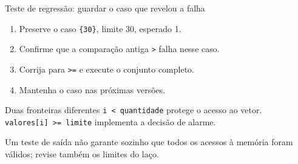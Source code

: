 \begin{frame}{Teste de regressão: guardar o caso que revelou a falha}
\begin{enumerate}
\item Preserve o caso \texttt{\{30\}}, limite 30, esperado 1.
\item Confirme que a comparação antiga \texttt{>} falha nesse caso.
\item Corrija para \texttt{>=} e execute o conjunto completo.
\item Mantenha o caso nas próximas versões.
\end{enumerate}
\begin{block}{Duas fronteiras diferentes}
\texttt{i < quantidade} protege o acesso ao vetor.\\
\texttt{valores[i] >= limite} implementa a decisão de alarme.
\end{block}
\small Um teste de saída não garante sozinho que todos os acessos à memória foram válidos; revise também os limites do laço.
\end{frame}
